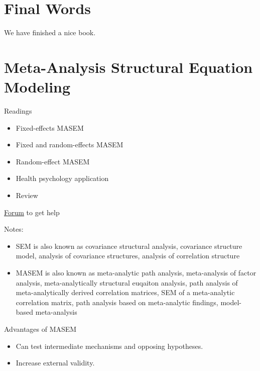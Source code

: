 \documentclass[
]{book}
\begin{document}
\hypertarget{final-words}{%
\chapter{Final Words}\label{final-words}}

We have finished a nice book.

\hypertarget{meta-analysis-structural-equation-modeling}{%
\chapter{Meta-Analysis Structural Equation Modeling}\label{meta-analysis-structural-equation-modeling}}

Readings

\begin{itemize}
\item
  Fixed-effects MASEM \citep{cheung2009}
\item
  Fixed and random-effects MASEM \citep{cheung2013}
\item
  Random-effect MASEM \citep{cheung2016}
\item
  Health psychology application \citep{cheung2017}
\item
  Review \citep{cheung2018}
\end{itemize}

\href{https://openmx.ssri.psu.edu//forums/third-party-software/metasem}{Forum} to get help

Notes:

\begin{itemize}
\item
  SEM is also known as covariance structural analysis, covariance structure model, analysis of covariance structures, analysis of correlation structure
\item
  MASEM is also known as meta-analytic path analysis, meta-analysis of factor analysis, meta-analytically structural euqaiton analysis, path analysis of meta-analytically derived correlation matrices, SEM of a meta-analytic correlation matrix, path analysis based on meta-analytic findings, model-based meta-analysis
\end{itemize}

Advantages of MASEM \citep{bergh2016using}

\begin{itemize}
\item
  Can test intermediate mechanisms and opposing hypotheses.
\item
  Increase external validity.
\end{itemize}
\end{document}
